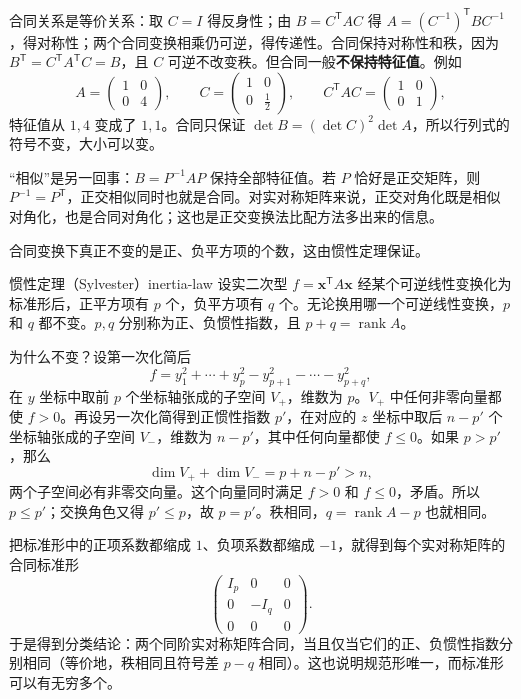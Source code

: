 合同关系是等价关系：取 $C=I$ 得反身性；由 $B=C^{\mathsf T}AC$ 得 $A=(C^{-1})^{\mathsf T}BC^{-1}$，得对称性；两个合同变换相乘仍可逆，得传递性。合同保持对称性和秩，因为 $B^{\mathsf T}=C^{\mathsf T}A^{\mathsf T}C=B$，且 $C$ 可逆不改变秩。但合同一般\textbf{不保持特征值}。例如
\[
A=\begin{pmatrix}1&0\\0&4\end{pmatrix},\qquad
C=\begin{pmatrix}1&0\\0&\frac12\end{pmatrix},\qquad
C^{\mathsf T}AC=\begin{pmatrix}1&0\\0&1\end{pmatrix},
\]
特征值从 $1,4$ 变成了 $1,1$。合同只保证 $\det B=(\det C)^2\det A$，所以行列式的符号不变，大小可以变。

“相似”是另一回事：$B=P^{-1}AP$ 保持全部特征值。若 $P$ 恰好是正交矩阵，则 $P^{-1}=P^{\mathsf T}$，正交相似同时也就是合同。对实对称矩阵来说，正交对角化既是相似对角化，也是合同对角化；这也是正交变换法比配方法多出来的信息。

合同变换下真正不变的是正、负平方项的个数，这由惯性定理保证。

\begin{conclusion}{惯性定理（Sylvester）}{inertia-law}
设实二次型 $f=\mathbf{x}^{\mathsf T}A\mathbf{x}$ 经某个可逆线性变换化为标准形后，正平方项有 $p$ 个，负平方项有 $q$ 个。无论换用哪一个可逆线性变换，$p$ 和 $q$ 都不变。$p,q$ 分别称为正、负惯性指数，且 $p+q=\operatorname{rank}A$。
\end{conclusion}

为什么不变？设第一次化简后
\[
f=y_1^2+\cdots+y_p^2-y_{p+1}^2-\cdots-y_{p+q}^2,
\]
在 $y$ 坐标中取前 $p$ 个坐标轴张成的子空间 $V_+$，维数为 $p$。$V_+$ 中任何非零向量都使 $f>0$。再设另一次化简得到正惯性指数 $p'$，在对应的 $z$ 坐标中取后 $n-p'$ 个坐标轴张成的子空间 $V_-$，维数为 $n-p'$，其中任何向量都使 $f\le0$。如果 $p>p'$，那么
\[
\dim V_++\dim V_-=p+n-p'>n,
\]
两个子空间必有非零交向量。这个向量同时满足 $f>0$ 和 $f\le0$，矛盾。所以 $p\le p'$；交换角色又得 $p'\le p$，故 $p=p'$。秩相同，$q=\operatorname{rank}A-p$ 也就相同。

把标准形中的正项系数都缩成 $1$、负项系数都缩成 $-1$，就得到每个实对称矩阵的合同标准形
\[
\begin{pmatrix}
I_p&0&0\\
0&-I_q&0\\
0&0&0
\end{pmatrix}.
\]
于是得到分类结论：两个同阶实对称矩阵合同，当且仅当它们的正、负惯性指数分别相同（等价地，秩相同且符号差 $p-q$ 相同）。这也说明规范形唯一，而标准形可以有无穷多个。

